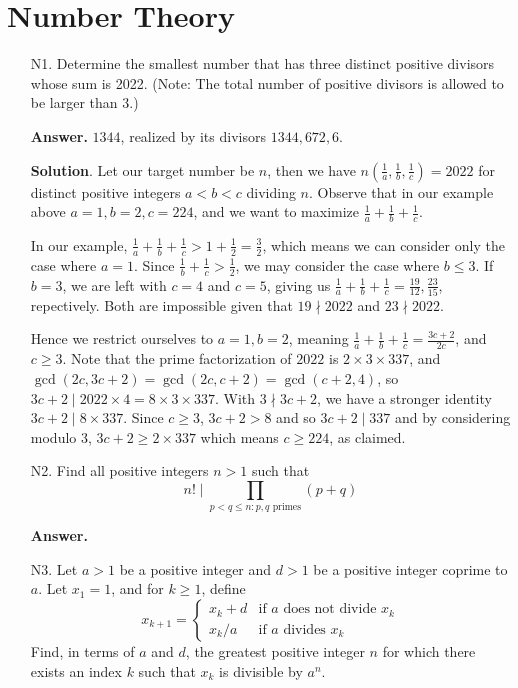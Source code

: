\documentclass[11pt,a4paper]{article}
\begin{document}
    \section*{Number Theory}
    \begin{enumerate}
    	\item [N1.]
    	Determine the smallest number that has three distinct positive divisors whose sum is 2022. (Note: The total number of positive divisors is allowed to be larger than 3.)
    	
    	\textbf{Answer.} $1344$, realized by its divisors $1344, 672, 6$. 
    	
    	\textbf{Solution}. Let our target number be $n$, then we have $n(\frac 1a, \frac 1b, \frac 1c)=2022$ for distinct positive integers $a < b < c$ dividing $n$. 
    	Observe that in our example above $a=1, b=2, c=224$, and we want to maximize $\frac 1a + \frac 1b + \frac 1c$. 
    	
    	In our example, $\frac 1a + \frac 1b + \frac 1c > 1 + \frac 12 = \frac 32$, which means we can consider only the case where $a = 1$. 
    	Since $\frac 1b + \frac 1c > \frac 12$, 
    	we may consider the case where $b\le 3$. 
    	If $b=3$, we are left with $c=4$ and $c=5$, 
    	giving us $\frac 1a + \frac 1b + \frac 1c = \frac{19}{12}, \frac{23}{15}$, repectively. 
    	Both are impossible given that $19\nmid 2022$ and $23\nmid 2022$. 
    	
    	Hence we restrict ourselves to $a=1, b=2$, meaning 
    	$\frac 1a + \frac 1b + \frac 1c = \frac{3c+2}{2c}$, and $c\ge 3$. 
    	Note that the prime factorization of $2022$ is $2\times 3\times 337$, 
    	and $\gcd(2c, 3c + 2)=\gcd(2c, c + 2) = \gcd(c + 2, 4)$, so $3c + 2\mid 2022 \times 4 = 8\times 3\times 337$. 
    	With $3\nmid 3c+2$, we have a stronger identity $3c+2\mid 8\times 337$. 
    	Since $c\ge 3$, $3c+2 > 8$ and so $3c+2\mid 337$ and by considering modulo 3, 
    	$3c+2\ge 2\times 337$ which means $c\ge 224$, as claimed. 
    	
    	\item [N2.]
    	Find all positive integers $n > 1$ such that
    	\[
    	n!\mid \prod_{p < q\le n: p, q\text{ primes}}
    	(p + q)
    	\]
    	
    	\textbf{Answer.} 
    	
    	\item [N3.]
    	Let $a > 1$ be a positive integer and $d > 1$ be a positive integer coprime to $a$. Let $x_1=1$, and for $k\geq 1$, define
    	$$x_{k+1} = \begin{cases}
    		x_k + d &\text{if } a \text{ does not divide } x_k \\
    		x_k/a & \text{if } a \text{ divides } x_k
    	\end{cases}$$Find, in terms of $a$ and $d$, the greatest positive integer $n$ for which there exists an index $k$ such that $x_k$ is divisible by $a^n$.
    

\end{enumerate}
\end{document}
